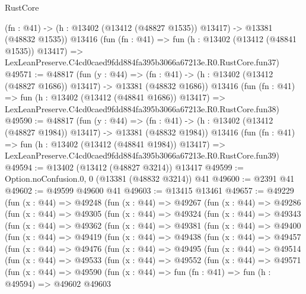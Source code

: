 \begin{lexlean}{RustCore}
\begin{coremodule}
    (fn : @41) -> (h : @13402 (@13412 (@48827 @1535)) @13417) -> @13381 (@48832 @1535))
    @13416
    (fun (fn : @41) =>
    fun (h : @13402 (@13412 (@48841 @1535)) @13417) =>
    LexLeanPreserve.C4cd0caed9fdd884fa395b3066a67213e.R0.RustCore.fun37)
@49571 := @48817
    (fun (y : @44) =>
    (fn : @41) -> (h : @13402 (@13412 (@48827 @1686)) @13417) -> @13381 (@48832 @1686))
    @13416
    (fun (fn : @41) =>
    fun (h : @13402 (@13412 (@48841 @1686)) @13417) =>
    LexLeanPreserve.C4cd0caed9fdd884fa395b3066a67213e.R0.RustCore.fun38)
@49590 := @48817
    (fun (y : @44) =>
    (fn : @41) -> (h : @13402 (@13412 (@48827 @1984)) @13417) -> @13381 (@48832 @1984))
    @13416
    (fun (fn : @41) =>
    fun (h : @13402 (@13412 (@48841 @1984)) @13417) =>
    LexLeanPreserve.C4cd0caed9fdd884fa395b3066a67213e.R0.RustCore.fun39)
@49594 := @13402 (@13412 (@48827 @3214)) @13417
@49599 := Option.noConfusion.{0, 0} (@13381 (@48832 @3214)) @41
@49600 := @2391 @41
@49602 := @49599 @49600 @41
@49603 := @13415 @13461
@49657 := @49229
    (fun (x : @44) =>
    @49248
      (fun (x : @44) =>
      @49267
        (fun (x : @44) =>
        @49286
          (fun (x : @44) =>
          @49305
            (fun (x : @44) =>
            @49324
              (fun (x : @44) =>
              @49343
                (fun (x : @44) =>
                @49362
                  (fun (x : @44) =>
                  @49381
                    (fun (x : @44) =>
                    @49400
                      (fun (x : @44) =>
                      @49419
                        (fun (x : @44) =>
                        @49438
                          (fun (x : @44) =>
                          @49457
                            (fun (x : @44) =>
                            @49476
                              (fun (x : @44) =>
                              @49495
                                (fun (x : @44) =>
                                @49514
                                  (fun (x : @44) =>
                                  @49533
                                    (fun (x : @44) =>
                                    @49552
                                      (fun (x : @44) =>
                                      @49571
                                        (fun (x : @44) =>
                                        @49590
                                          (fun (x : @44) =>
                                          fun (fn : @41) =>
                                          fun (h : @49594) =>
                                          @49602
                                            @49603

\end{coremodule}
\end{lexlean}
